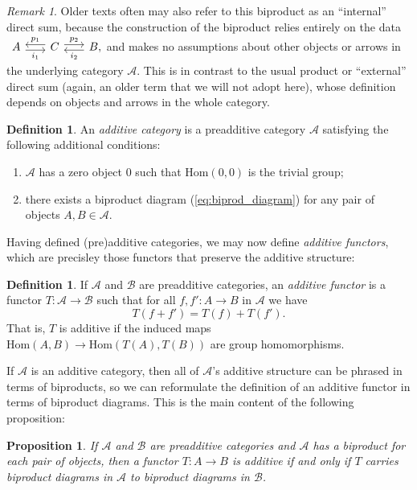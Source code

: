 \documentclass[10pt,oneside]{book}
\def\~#1{\mathscr{#1}}
\newcommand{\Hom}{\mathrm{Hom}}
\theoremstyle{plain}
\newtheorem{prop}[thm]{Proposition}
\theoremstyle{definition}
\newtheorem{defn}[thm]{Definition}
\theoremstyle{remark}
\newtheorem*{rmk}{Remark}
\numberwithin{equation}{section}
\numberwithin{figure}{section}
\begin{document}
\begin{rmk}
Older texts often may also refer to this biproduct as an ``internal'' direct sum, because the construction of the biproduct relies entirely on the data $\begin{tikzcd}[sep = scriptsize]
            A & C & B,
            \arrow["{i_1}"', shift right, from=1-1, to=1-2]
            \arrow["{p_1}"', shift right, from=1-2, to=1-1]
            \arrow["{p_2}", shift left, from=1-2, to=1-3]
            \arrow["{i_2}", shift left, from=1-3, to=1-2]
\end{tikzcd}$and makes no assumptions about other objects or arrows in the underlying category $\~A$. This is in contrast to the usual product or ``external'' direct sum (again, an older term that we will not adopt here), whose definition depends on objects and arrows in the whole category. 
\end{rmk}
 

\begin{defn}\label{def:additive category}
    An \emph{additive category} is a preadditive category $\~A$ satisfying the following additional conditions:
    \begin{enumerate}[label=(\roman*)]
        \item $\~A$ has a zero object $0$ such that $\Hom(0, 0)$ is the trivial group;
        \item  there exists a biproduct diagram (\ref{eq:biprod_diagram}) for any pair of objects $A, B \in \~A$.
    \end{enumerate}
\end{defn}
Having defined (pre)additive categories, we may now define \emph{additive functors}, which are precisley those functors that preserve the additive structure:
\begin{defn}
\label{defn:adfunctor1}
    If $\~A$ and $\~B$ are preadditive categories, an \emph{additive functor} is a functor $T: \~A \to \~B$ such that for all $f, f':A \to B$ in $\~A$ we have
    \[T(f + f') = T(f) + T(f').\]
    That is, $T$ is additive if the induced maps $\Hom(A, B) \to \Hom(T(A), T(B))$ are group homomorphisms.
\end{defn}

If $\~A$ is an additive category, then all of $\~A$'s additive structure can be phrased in terms of biproducts, so we can reformulate the definition of an additive functor in terms of biproduct diagrams. This is the main content of the following proposition:
\begin{prop}
    If $\~A$ and $\~B$ are preadditive categories and $\~A$ has a biproduct for each pair of objects, then a functor $T: A \to B$ is additive if and only if $T$ carries biproduct diagrams in $\~A$ to biproduct diagrams in $\~B$.
\end{prop}
\end{document}
